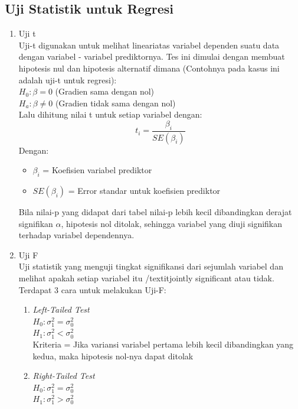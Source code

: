 \begin{enumerate}
\subsection{Uji Statistik untuk Regresi}
\begin{enumerate}
    \item Uji t \\
    Uji-t digunakan untuk melihat lineariatas variabel dependen suatu data dengan variabel - variabel prediktornya. Tes ini dimulai dengan membuat hipotesis nul dan hipotesis alternatif dimana (Contohnya pada kasus ini adalah uji-t untuk regresi): \\
    $H_0: \beta = 0$ (Gradien sama dengan nol)\\
    $H_a: \beta \neq 0$ (Gradien tidak sama dengan nol)\\
    Lalu dihitung nilai t untuk setiap variabel dengan:
    \begin{equation*}
        t_i = \frac{\beta_i}{SE(\beta_i)}
    \end{equation*}
    Dengan:
    \begin{itemize}
        \item $\beta_i$ = Koefisien variabel prediktor
        \item $SE(\beta_i)$ = Error standar untuk koefisien prediktor
    \end{itemize}
    Bila nilai-p yang didapat dari tabel nilai-p lebih kecil dibandingkan derajat signifikan $\alpha$, hipotesis nol ditolak, sehingga variabel yang diuji signifikan terhadap variabel dependennya.
    \item Uji F \\
    Uji statistik yang menguji tingkat signifikansi dari sejumlah variabel dan melihat apakah setiap variabel itu /textit{jointly significant} atau tidak. Terdapat 3 cara untuk melakukan Uji-F:
    \begin{enumerate}
        \item \textit{Left-Tailed Test} \\
        $H_0:\sigma_1^2 = \sigma_0^2$ \\
        $H_1:\sigma_1^2 < \sigma_0^2$ \\
        Kriteria = Jika variansi variabel pertama lebih kecil dibandingkan yang kedua, maka hipotesis nol-nya dapat ditolak
        \item \textit{Right-Tailed Test} \\
        $H_0:\sigma_1^2 = \sigma_0^2$ \\
        $H_1:\sigma_1^2 > \sigma_0^2$ \\

\end{enumerate}
\end{enumerate}
\end{enumerate}
